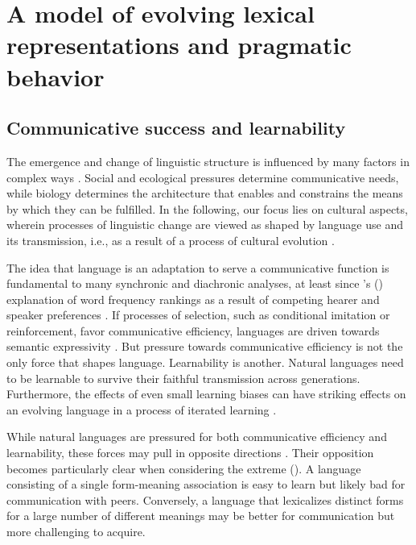 \documentclass[a4paper, 11pt]{article}
\theoremstyle{Satz}
\newcommand{\citeposs}[2][]{\citeauthor{#2}'s (\citeyear[#1]{#2})}
\begin{document}
\section{A model of evolving lexical representations and pragmatic behavior}
\label{sec:model}

\subsection{Communicative success and learnability}

The emergence and change of linguistic structure is influenced by many factors in complex ways
\citep{benz+etal:2005b,steels:2011,tamariz+kirby:2016}. Social and ecological pressures
determine communicative needs, while biology determines the architecture that enables and
constrains the means by which they can be fulfilled. In the following, our focus lies on
cultural aspects, wherein processes of linguistic change are viewed as shaped by language use
and its transmission, i.e., as a result of a process of cultural evolution
\citep{Pagel2009:Human-Language-,ThompsonKirby2016:Culture-Shapes-}.

The idea that language is an adaptation to serve a communicative function is fundamental to
many synchronic and diachronic analyses, at least since \citeposs{zipf:1949} explanation of
word frequency rankings as a result of competing hearer and speaker preferences \citep[e.g.,
in][]{martinet:1962, horn:1984,jaeger+vRooij:2007,jaeger:2007,
  piantadosi:2014,kirby+etal:2015}. If processes of selection, such as conditional imitation or
reinforcement, favor communicative efficiency, languages are driven towards semantic
expressivity \citep[e.g.,][]{nowak+krakauer:1999,Skyrms2010:Signals}. But pressure towards
communicative efficiency is not the only force that shapes language. Learnability is another.
Natural languages need to be learnable to survive their faithful transmission across
generations. Furthermore, the effects of even small learning biases can have striking effects
on an evolving language in a process of iterated learning
\citep{KirbyHurford2002:The-Emergence-o,SmithKirby2003:Iterated-Learni,kirby+etal:2014}.

While natural languages are pressured for both communicative efficiency and learnability, these forces may
pull in opposite directions \citep[\S7]{christiansen+chater:2008}. Their opposition becomes particularly clear when considering the
extreme (\citealt{kemp+regier:2012,kirby+etal:2015}). A language consisting of a single
form-meaning association is easy to learn but likely bad for communication with peers. Conversely, a language
that lexicalizes distinct forms for a large number of different meanings may be better for communication 
but more challenging to acquire.
\end{document}
